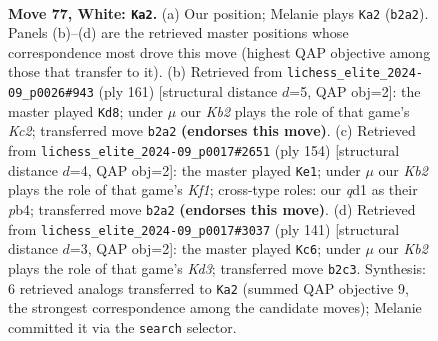 \documentclass[11pt]{article}
\begin{document}
\clearpage

\begin{figure}[p]\centering
\begin{subfigure}{0.46\textwidth}\centering
\resizebox{\linewidth}{!}{%
\newchessgame
\chessboard[
  setfen={8/8/1p6/p4k2/2P5/8/1K6/3q4 w - - 10 77},
  showmover=false,
  pgfstyle=straightmove, color=movearrow, markmove={b2-a2}
]}
\caption{}
\end{subfigure}\hfill
\begin{subfigure}{0.46\textwidth}\centering
\resizebox{\linewidth}{!}{%
\newchessgame
\chessboard[
  setfen={8/2k5/p7/P7/1P2K3/8/8/8 b - - 0 81},
  showmover=false,
  pgfstyle=straightmove, color=movearrow, markmove={c7-d8}
]}
\caption{}
\end{subfigure}
\\[4pt]
\begin{subfigure}{0.46\textwidth}\centering
\resizebox{\linewidth}{!}{%
\newchessgame
\chessboard[
  setfen={8/8/8/3k2p1/1p3pP1/8/8/5K2 w - - 0 78},
  showmover=false,
  pgfstyle=straightmove, color=movearrow, markmove={f1-e1}
]}
\caption{}
\end{subfigure}\hfill
\begin{subfigure}{0.46\textwidth}\centering
\resizebox{\linewidth}{!}{%
\newchessgame
\chessboard[
  setfen={8/5Q2/3k4/8/4K3/2P5/1P6/8 b - - 2 71},
  showmover=false,
  pgfstyle=straightmove, color=movearrow, markmove={d6-c6}
]}
\caption{}
\end{subfigure}
\caption{\textbf{Move 77, White: \texttt{Ka2}.} (a) Our position; Melanie plays \texttt{Ka2} (\texttt{b2a2}). Panels (b)--(d) are the retrieved master positions whose correspondence most drove this move (highest QAP objective among those that transfer to it). (b) Retrieved from \texttt{lichess\_elite\_2024-09\_p0026\#943} (ply 161) [structural distance $d$=5, QAP obj=2]: the master played \texttt{Kd8}; under $\mu$ our \emph{Kb2} plays the role of that game's \emph{Kc2}; transferred move \texttt{b2a2} \textbf{(endorses this move)}. (c) Retrieved from \texttt{lichess\_elite\_2024-09\_p0017\#2651} (ply 154) [structural distance $d$=4, QAP obj=2]: the master played \texttt{Ke1}; under $\mu$ our \emph{Kb2} plays the role of that game's \emph{Kf1}; cross-type roles: our \emph{q}d1 as their \emph{p}b4; transferred move \texttt{b2a2} \textbf{(endorses this move)}. (d) Retrieved from \texttt{lichess\_elite\_2024-09\_p0017\#3037} (ply 141) [structural distance $d$=3, QAP obj=2]: the master played \texttt{Kc6}; under $\mu$ our \emph{Kb2} plays the role of that game's \emph{Kd3}; transferred move \texttt{b2c3}. Synthesis: 6 retrieved analogs transferred to \texttt{Ka2} (summed QAP objective 9, the strongest correspondence among the candidate moves); Melanie committed it via the \texttt{search} selector.}
\label{fig:thought-m152}
\end{figure}
\end{document}
